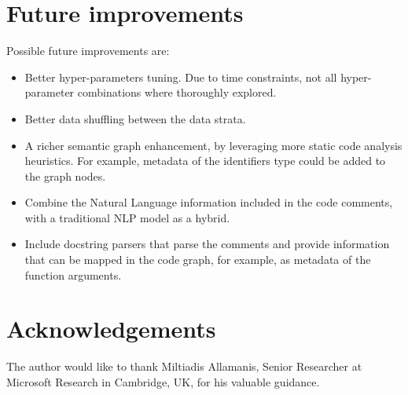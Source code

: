 \documentclass{article}
\begin{document}
\section{Future improvements}
Possible future improvements are: 
\begin{itemize}
  \item Better hyper-parameters tuning. Due to time constraints, not all hyper-parameter combinations where thoroughly explored.
  \item Better data shuffling between the data strata.
  \item A richer semantic graph enhancement, by leveraging more static code analysis heuristics. For example, metadata of the identifiers type could be added to the graph nodes.
  \item Combine the Natural Language information included in the code comments, with a traditional NLP model as a hybrid.
  \item Include docstring parsers that parse the comments and provide information that can be mapped in the code graph, for example, as metadata of the function arguments.
\end{itemize}


\section*{Acknowledgements}
The author would like to thank Miltiadis Allamanis, Senior Researcher at Microsoft Research in Cambridge, UK, for his valuable guidance.

  
 
\end{document}
